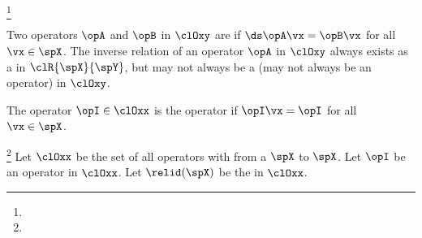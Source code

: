 \begin{definition}
\footnote{
  }
\label{def:operator}
\end{definition}

Two operators $\opA$ and $\opB$ in $\clOxy$ are  if 
$\ds \opA\vx=\opB\vx$ for all $\vx\in\spX$.
The inverse relation of an operator $\opA$ in $\clOxy$
always exists as a  in $\clR{\spX}{\spY}$,
but may not always be a  (may not always be an operator)
in $\clOxy$.


The operator $\opI\in\clOxx$ is the  operator if $\opI\vx=\opI$ for all $\vx\in\spX$.
\begin{definition}
\footnote{
  }
\label{def:opI}
\label{def:op_inv}
Let $\clOxx$ be the set of all operators with from a  $\spX$ to $\spX$.
Let $\opI$ be an operator in $\clOxx$.
Let $\relid(\spX)$ be the  in $\clOxx$.
\end{definition}




